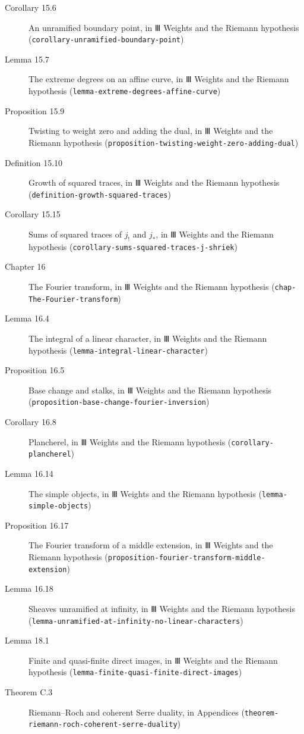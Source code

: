 \documentclass[11pt]{article}
\newcommand{\bpslug}[1]{\texttt{#1}}
\begin{document}
\begin{description}
\item[Corollary 15.6] An unramified boundary point, in Ⅲ Weights and the Riemann hypothesis (\bpslug{corollary-{}\allowbreak{}unramified-{}\allowbreak{}boundary-{}\allowbreak{}point})
\item[Lemma 15.7] The extreme degrees on an affine curve, in Ⅲ Weights and the Riemann hypothesis (\bpslug{lemma-{}\allowbreak{}extreme-{}\allowbreak{}degrees-{}\allowbreak{}affine-{}\allowbreak{}curve})
\item[Proposition 15.9] Twisting to weight zero and adding the dual, in Ⅲ Weights and the Riemann hypothesis (\bpslug{proposition-{}\allowbreak{}twisting-{}\allowbreak{}weight-{}\allowbreak{}zero-{}\allowbreak{}adding-{}\allowbreak{}dual})
\item[Definition 15.10] Growth of squared traces, in Ⅲ Weights and the Riemann hypothesis (\bpslug{definition-{}\allowbreak{}growth-{}\allowbreak{}squared-{}\allowbreak{}traces})
\item[Corollary 15.15] Sums of squared traces of $j_!$ and $j_*$, in Ⅲ Weights and the Riemann hypothesis (\bpslug{corollary-{}\allowbreak{}sums-{}\allowbreak{}squared-{}\allowbreak{}traces-{}\allowbreak{}j-{}\allowbreak{}shriek})
\item[Chapter 16] The Fourier transform, in Ⅲ Weights and the Riemann hypothesis (\bpslug{chap-{}\allowbreak{}The-{}\allowbreak{}Fourier-{}\allowbreak{}transform})
\item[Lemma 16.4] The integral of a linear character, in Ⅲ Weights and the Riemann hypothesis (\bpslug{lemma-{}\allowbreak{}integral-{}\allowbreak{}linear-{}\allowbreak{}character})
\item[Proposition 16.5] Base change and stalks, in Ⅲ Weights and the Riemann hypothesis (\bpslug{proposition-{}\allowbreak{}base-{}\allowbreak{}change-{}\allowbreak{}fourier-{}\allowbreak{}inversion})
\item[Corollary 16.8] Plancherel, in Ⅲ Weights and the Riemann hypothesis (\bpslug{corollary-{}\allowbreak{}plancherel})
\item[Lemma 16.14] The simple objects, in Ⅲ Weights and the Riemann hypothesis (\bpslug{lemma-{}\allowbreak{}simple-{}\allowbreak{}objects})
\item[Proposition 16.17] The Fourier transform of a middle extension, in Ⅲ Weights and the Riemann hypothesis (\bpslug{proposition-{}\allowbreak{}fourier-{}\allowbreak{}transform-{}\allowbreak{}middle-{}\allowbreak{}extension})
\item[Lemma 16.18] Sheaves unramified at infinity, in Ⅲ Weights and the Riemann hypothesis (\bpslug{lemma-{}\allowbreak{}unramified-{}\allowbreak{}at-{}\allowbreak{}infinity-{}\allowbreak{}no-{}\allowbreak{}linear-{}\allowbreak{}characters})
\item[Lemma 18.1] Finite and quasi-finite direct images, in Ⅲ Weights and the Riemann hypothesis (\bpslug{lemma-{}\allowbreak{}finite-{}\allowbreak{}quasi-{}\allowbreak{}finite-{}\allowbreak{}direct-{}\allowbreak{}images})
\item[Theorem C.3] Riemann–Roch and coherent Serre duality, in Appendices (\bpslug{theorem-{}\allowbreak{}riemann-{}\allowbreak{}roch-{}\allowbreak{}coherent-{}\allowbreak{}serre-{}\allowbreak{}duality})
\end{description}
\end{document}
